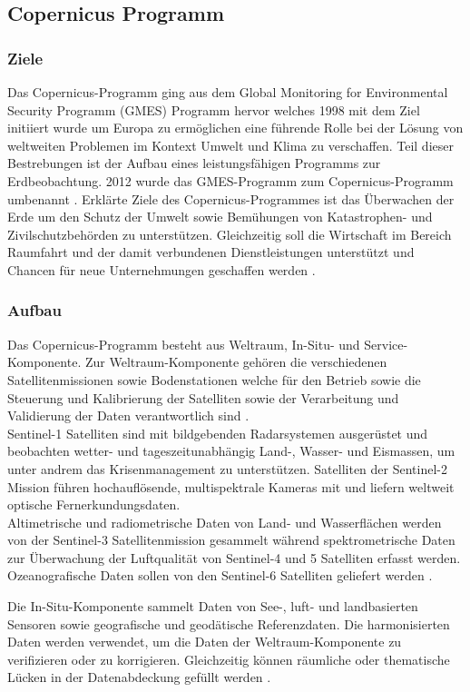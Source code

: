 \subsection{Copernicus Programm}
\subsubsection{Ziele}
Das Copernicus-Programm ging aus dem Global Monitoring for Environmental Security Programm (GMES) Programm hervor welches 1998 mit dem Ziel initiiert wurde um Europa 
zu ermöglichen eine führende Rolle bei der Lösung von weltweiten Problemen im Kontext Umwelt und Klima zu verschaffen. Teil dieser Bestrebungen ist der Aufbau eines 
leistungsfähigen Programms zur Erdbeobachtung. 2012 wurde das GMES-Programm zum Copernicus-Programm umbenannt \cite{history_of_copernicus}.
Erklärte Ziele des Copernicus-Programmes ist das Überwachen der Erde um den Schutz der Umwelt sowie Bemühungen von Katastrophen- und Zivilschutzbehörden zu 
unterstützen. Gleichzeitig soll die Wirtschaft im Bereich Raumfahrt und der damit verbundenen Dienstleistungen unterstützt und Chancen für neue Unternehmungen geschaffen
werden \cite{copernicus_regulation}.

\subsubsection{Aufbau}
Das Copernicus-Programm besteht aus Weltraum, In-Situ- und Service-Komponente. 
Zur Weltraum-Komponente gehören die verschiedenen Satellitenmissionen sowie Bodenstationen welche für den Betrieb sowie die Steuerung und Kalibrierung der 
Satelliten sowie der Verarbeitung und Validierung der Daten verantwortlich sind \cite{copernicus_regulation}. \\ 
Sentinel-1 Satelliten sind mit bildgebenden Radarsystemen ausgerüstet und beobachten wetter- und tageszeitunabhängig Land-, Wasser- und Eismassen, um unter andrem das 
Krisenmanagement zu unterstützen.
Satelliten der Sentinel-2 Mission führen hochauflösende, multispektrale Kameras mit und liefern weltweit optische Fernerkundungsdaten. \\
Altimetrische und radiometrische Daten von Land- und Wasserflächen werden von der Sentinel-3 Satellitenmission gesammelt während spektrometrische Daten zur 
Überwachung der Luftqualität von Sentinel-4 und 5 Satelliten erfasst werden.
Ozeanografische Daten sollen von den Sentinel-6 Satelliten geliefert werden \cite{sentinel_overview}.

Die In-Situ-Komponente sammelt Daten von See-, luft- und landbasierten Sensoren sowie geografische und geodätische Referenzdaten. Die harmonisierten Daten 
werden verwendet, um die Daten der Weltraum-Komponente zu verifizieren oder zu korrigieren. Gleichzeitig können räumliche oder thematische Lücken in der 
Datenabdeckung gefüllt werden \cite{copernicus_regulation}\cite{what_is_copernicus}. \\

